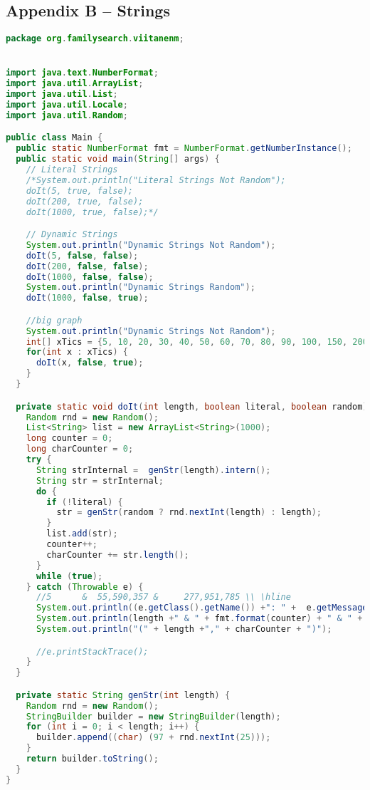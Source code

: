 \subsection*{Appendix B -- Strings} \label{App:AppendixB}
\begin{lstlisting}[language=Java]
package org.familysearch.viitanenm;


import java.text.NumberFormat;
import java.util.ArrayList;
import java.util.List;
import java.util.Locale;
import java.util.Random;

public class Main {
  public static NumberFormat fmt = NumberFormat.getNumberInstance();
  public static void main(String[] args) {
    // Literal Strings
    /*System.out.println("Literal Strings Not Random");
    doIt(5, true, false);
    doIt(200, true, false);
    doIt(1000, true, false);*/

    // Dynamic Strings
    System.out.println("Dynamic Strings Not Random");
    doIt(5, false, false);
    doIt(200, false, false);
    doIt(1000, false, false);
    System.out.println("Dynamic Strings Random");
    doIt(1000, false, true);

    //big graph
    System.out.println("Dynamic Strings Not Random");
    int[] xTics = {5, 10, 20, 30, 40, 50, 60, 70, 80, 90, 100, 150, 200, 250, 300, 350, 400, 450, 500, 600, 700, 800, 900, 1000};
    for(int x : xTics) {
      doIt(x, false, true);
    }
  }

  private static void doIt(int length, boolean literal, boolean random) {
    Random rnd = new Random();
    List<String> list = new ArrayList<String>(1000);
    long counter = 0;
    long charCounter = 0;
    try {
      String strInternal =  genStr(length).intern();
      String str = strInternal;
      do {
        if (!literal) {
          str = genStr(random ? rnd.nextInt(length) : length);
        }
        list.add(str);
        counter++;
        charCounter += str.length();
      }
      while (true);
    } catch (Throwable e) {
      //5      &  55,590,357 &     277,951,785 \\ \hline
      System.out.println((e.getClass().getName()) +": " +  e.getMessage());
      System.out.println(length +" & " + fmt.format(counter) + " & " + fmt.format(charCounter) + " \\\\ \\hline");
      System.out.println("(" + length +"," + charCounter + ")");

      //e.printStackTrace();
    }
  }

  private static String genStr(int length) {
    Random rnd = new Random();
    StringBuilder builder = new StringBuilder(length);
    for (int i = 0; i < length; i++) {
      builder.append((char) (97 + rnd.nextInt(25)));
    }
    return builder.toString();
  }
}
\end{lstlisting}